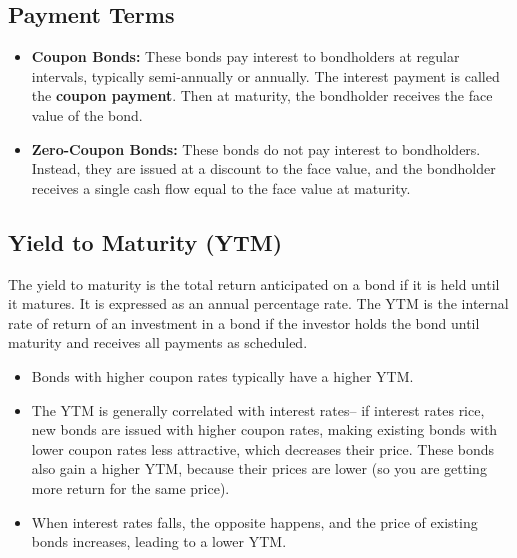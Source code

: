 \subsection*{Payment Terms}
\begin{itemize}
    \item \textbf{Coupon Bonds:} These bonds pay interest to bondholders at regular intervals, typically semi-annually or annually. The interest payment is called the \textbf{coupon payment}. Then at maturity, the bondholder receives the face value of the bond.
    \item \textbf{Zero-Coupon Bonds:} These bonds do not pay interest to bondholders. Instead, they are issued at a discount to the face value, and the bondholder receives a single cash flow equal to the face value at maturity.
\end{itemize}

\subsection*{Yield to Maturity (YTM)}
The yield to maturity is the total return anticipated on a bond if it is held until it matures. It is expressed as an annual percentage rate. The YTM is the internal rate of return of an investment in a bond if the investor holds the bond until maturity and receives all payments as scheduled.

\begin{itemize}
    \item Bonds with higher coupon rates typically have a higher YTM.
    \item The YTM is generally  correlated with interest rates– if interest rates rice, new bonds are issued with higher coupon rates, making existing bonds with lower coupon rates less attractive, which decreases their price. These bonds also gain a higher YTM, because their prices are lower (so you are getting more return for the same price).
    \item When interest rates falls, the opposite happens, and the price of existing bonds increases, leading to a lower YTM.
\end{itemize}


